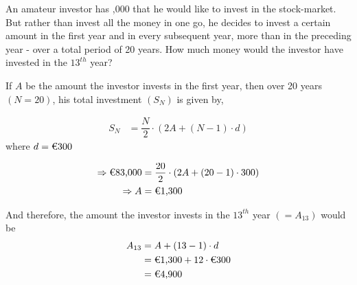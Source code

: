 
\question[4]  An amateur investor has ,000 that he would like to invest in the
stock-market. But rather than invest all the money in one go, he decides to invest 
a certain amount in the first year and in every subsequent year,  more than
in the preceding year - over a total period of 20 years. How much money would the investor 
have invested in the $13^{th}$ year?


\ifprintanswers
\fi 

\begin{solution}[\halfpage]
  If $A$ be the amount the investor invests in the first year, then over 20 years $(N=20)$, his
  total investment $(S_N)$ is given by, 

  \begin{align}
    S_N &= \dfrac{N}{2}\cdot(2A + (N-1)\cdot d)
  \end{align}
  where $d=\text{\texteuro 300}$

  \begin{align}
    \Rightarrow \text{\texteuro 83,000} &= \dfrac{20}{2}\cdot(2A + (20-1)\cdot 300) \\
    \Rightarrow A &= \text{\texteuro 1,300}
  \end{align}

  And therefore, the amount the investor invests in the $13^{th}$ year $(=A_{13})$ would be
  \begin{align}
    A_{13} &= A + (13-1)\cdot d \\
           &= \text{\texteuro 1,300} + 12\cdot \text{\texteuro 300} \\
           &= \text{\texteuro 4,900}
  \end{align}
\end{solution}
